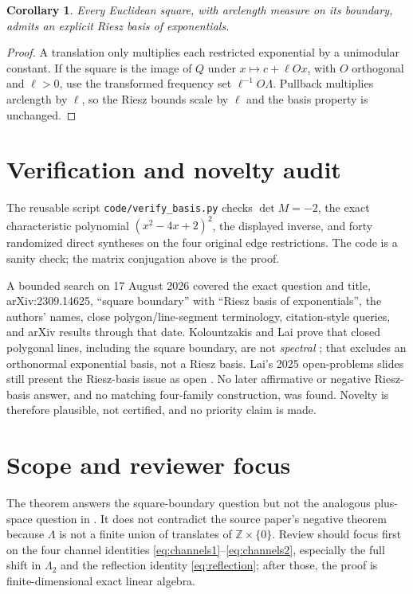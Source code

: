 \documentclass[11pt]{article}
\newtheorem{corollary}[theorem]{Corollary}
\newcommand{\Z}{\mathbb Z}
\begin{document}
\begin{corollary}
Every Euclidean square, with arclength measure on its boundary, admits an
explicit Riesz basis of exponentials.
\end{corollary}
\begin{proof}
A translation only multiplies each restricted exponential by a unimodular
constant.  If the square is the image of $Q$ under $x\mapsto c+\ell Ox$, with
$O$ orthogonal and $\ell>0$, use the transformed frequency set
$\ell^{-1}O\Lambda$.  Pullback multiplies arclength by $\ell$, so the Riesz
bounds scale by $\ell$ and the basis property is unchanged.
\end{proof}

\section{Verification and novelty audit}

The reusable script \texttt{code/verify\_basis.py} checks $\det M=-2$, the
exact characteristic polynomial $(x^2-4x+2)^2$, the displayed inverse, and
forty randomized direct syntheses on the four original edge restrictions.
The code is a sanity check; the matrix conjugation above is the proof.

A bounded search on 17 August 2026 covered the exact question and title,
arXiv:2309.14625, ``square boundary'' with ``Riesz basis of exponentials'',
the authors' names, close polygon/line-segment terminology, citation-style
queries, and arXiv results through that date.  Kolountzakis and Lai prove that
closed polygonal lines, including the square boundary, are not
\emph{spectral} \cite{KolountzakisLai}; that excludes an orthonormal
exponential basis, not a Riesz basis.  Lai's 2025 open-problems slides still
present the Riesz-basis issue as open \cite{LaiSlides}.  No later affirmative
or negative Riesz-basis answer, and no matching four-family construction, was
found.  Novelty is therefore plausible, not certified, and no priority claim
is made.

\section{Scope and reviewer focus}

The theorem answers the square-boundary question but not the analogous
plus-space question in \cite{LaiSheynis}.  It does not contradict the source
paper's negative theorem because $\Lambda$ is not a finite union of translates
of $\Z\times\{0\}$.  Review should focus first on the four channel identities
\eqref{eq:channels1}--\eqref{eq:channels2}, especially the full shift in
$\Lambda_2$ and the reflection identity \eqref{eq:reflection}; after those,
the proof is finite-dimensional exact linear algebra.
\end{document}
